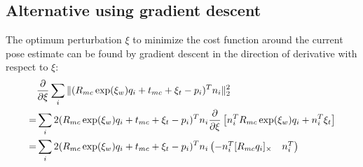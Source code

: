 \subsection{Alternative using gradient descent}

The optimum perturbation $\xi$ to minimize the cost function around the
current pose estimate can be found by gradient descent in the direction of derivative with
respect to $\xi$:
\begin{align}
  & \frac{\partial }{\partial \xi} \sum_i \| ( R_{mc} \exp(\xi_w) q_i + t_{mc} + \xi_t - p_i )^T n_i \|^2_2\\
  =&  \sum_i 2 ( R_{mc} \exp(\xi_w) q_i + t_{mc} + \xi_t - p_i )^T n_i  \frac{\partial }{\partial \xi}
  \left[ n_i^T R_{mc} \exp(\xi_w) q_i   + n_i^T \xi_t
  \right]\\
  =&  \sum_i 2 ( R_{mc} \exp(\xi_w) q_i + t_{mc} + \xi_t - p_i )^T n_i  
  \begin{pmatrix}
    - n_i^T [R_{mc} q_i]_\times  & n_i^T
  \end{pmatrix}
\end{align}
